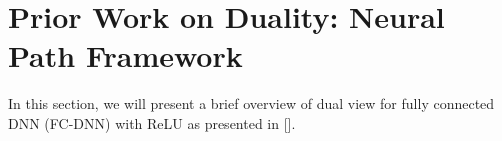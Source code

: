\section{Prior Work on Duality: Neural Path Framework}\label{sec:dual}
In this section, we will present a brief overview of dual view for fully connected DNN (FC-DNN) with ReLU as presented in []. 

